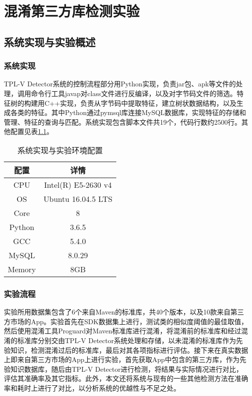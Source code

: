 \chapter{混淆第三方库检测实验}



\section{系统实现与实验概述}

\subsection{系统实现}
TPL-V Detector系统的控制流程部分用Python实现，负责jar包、apk等文件的处理，调用命令行工具javap对class文件进行反编译，以及对字节码文件的筛选。特征树的构建用C++实现，负责从字节码中提取特征，建立树状数据结构，以及生成各类的特征。其中Python通过pymsql库连接MySQL数据库，实现特征的存储和管理、特征的查询与匹配。系统实现包含脚本文件共19个，代码行数约2500行。其他配置见表\ref{tab:config}。

\begin{table}[!hpt]
  \caption{系统实现与实验环境配置}
  \label{tab:config}
  \centering
  \begin{tabular}{cc} \toprule
    配置 &  详情 \\ \midrule
	CPU & Intel(R) E5-2630 v4\\
	OS & Ubuntu 16.04.5 LTS\\
	Core & 8\\
	Python & 3.6.5\\
	GCC & 5.4.0\\
	MySQL & 8.0.29\\
	Memory & 8GB\\
	 \bottomrule

  \end{tabular}
\end{table}


\subsection{实验流程}
实验所用数据集包含了6个来自Maven的标准库，共40个版本，以及10款来自第三方市场的App。实验首先在SDK数据集上进行，测试类的相似度阈值的最佳取值，然后使用混淆工具Proguard对Maven标准库进行混淆，将混淆前的标准库和经过混淆的标准库分别交由TPL-V Detector系统处理和存储，以未混淆的标准库作为先验知识，检测混淆过后的标准库，最后对其各项指标进行评估。接下来在真实数据上即来自第三方市场的App上进行实验，首先获取App中包含的第三方库，作为先验知识数据库，随后由TPL-V Detector进行检测，将结果与实际情况进行对比，评估其准确率及其它指标。此外，本文还将系统与现有的一些其他检测方法在准确率和耗时上进行了对比，以分析系统的优越性与不足之处。

